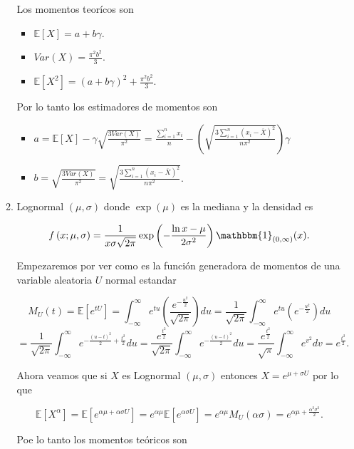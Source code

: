 \documentclass[letterpaper]{article}
\theoremstyle{definition}
\theoremstyle{lemathm}
\theoremstyle{lemathm}
\theoremstyle{lemathm}
\theoremstyle{lemademthm}
\newcommand{\pars}[1]{\left( #1 \right) }
\newcommand{\bracs}[1]{\left[ #1 \right] }
\newcommand{\EE}{\mathbb{E}}
\newcommand{\1}{\mathbbm{1}}
\begin{document}
\begin{enumerate}
\begin{enumerate}
			Los momentos teorícos son

			\begin{itemize}
				\item $\EE\bracs{X} = a + b\gamma$.
				\item $Var\pars{X} = \frac{\pi^2b^2}{3}$.
				\item $\EE\bracs{X^2} = \pars{a + b\gamma}^2 + \frac{\pi^2b^2}{3}$.
			\end{itemize}

			Por lo tanto los estimadores de momentos son

			\begin{itemize}
				\item $a = \EE\bracs{X} - \gamma\sqrt{\frac{3Var\pars{X}}{\pi^2}} = \frac{\sum_{i=1}^n x_i}{n} - \pars{\sqrt{\frac{3\sum_{i=1}^n \pars{x_i-\overline{X}}^2}{n\pi^2}}}\gamma$
				\item $b = \sqrt{\frac{3Var\pars{X}}{\pi^2}} = \sqrt{\frac{3\sum_{i=1}^n \pars{x_i-\overline{X}}^2}{n\pi^2}}$.
			\end{itemize}

			\item Lognormal $\pars{\mu,\sigma}$ donde $\exp\pars{\mu}$ es la mediana y la densidad es
			
			\[f\pars{x;\mu,\sigma} = \frac{1}{x\sigma\sqrt{2\pi}}\exp\pars{-\frac{\ln x - \mu}{2\sigma^2}}\1_{\pars{0,\infty}}(x).\]

			Empezaremos por ver como es la función generadora de momentos de una variable aleatoria $U$ normal estandar

			\[M_U\pars{t} = \EE\bracs{e^{tU}} = \int_{-\infty}^{\infty} e^{tu}\pars{\frac{e^{-\frac{u^2}{2}}}{\sqrt{2\pi}}} du = \frac{1}{\sqrt{2\pi}} \int_{-\infty}^{\infty} e^{tu}\pars{e^{-\frac{u^2}{2}}} du\]\[= \frac{1}{\sqrt{2\pi}} \int_{-\infty}^{\infty} e^{-\frac{\pars{u-t}^2}{2} + \frac{t^2}{2}} du = \frac{e^{\frac{t^2}{2}}}{\sqrt{2\pi}} \int_{-\infty}^{\infty} e^{-\frac{\pars{u-t}^2}{2}} du = \frac{e^{\frac{t^2}{2}}}{\sqrt{\pi}} \int_{-\infty}^{\infty} e^{v^2} dv = e^{\frac{t^2}{2}}.\]

			Ahora veamos que si $X$ es Lognormal $\pars{\mu,\sigma}$ entonces $X = e^{\mu+\sigma U}$ por lo que

			\[\EE\bracs{X^{\alpha}} = \EE\bracs{e^{\alpha\mu+\alpha\sigma U}} = e^{\alpha\mu}\EE\bracs{e^{\alpha\sigma U}} = e^{\alpha\mu} M_U\pars{\alpha\sigma} = e^{\alpha\mu + \frac{\alpha^2\sigma^2}{2}}.\]

			Poe lo tanto los momentos teóricos son


\end{enumerate}
\end{enumerate}
\end{document}
